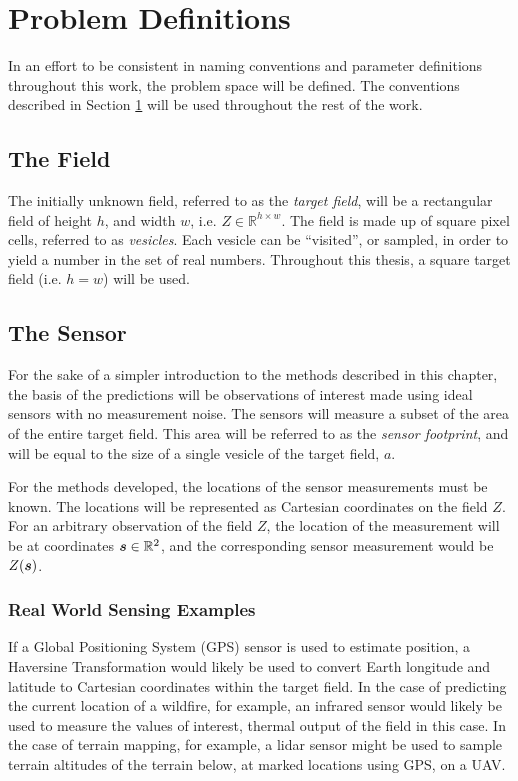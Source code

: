 \chapter{Problem Definitions} \label{ch:defs}
In an effort to be consistent in naming conventions and parameter definitions throughout this work, the problem space will be defined. The conventions described in Section \ref{ch:defs} will be used throughout the rest of the work.

\section{The Field}
The initially unknown field, referred to as the \textit{target field}, will be a rectangular field of height $h$, and width $w$, i.e. $Z \in \mathbb{R}^{h \times w}$. The field is made up of square pixel cells, referred to as \textit{vesicles}. Each vesicle can be ``visited'', or sampled, in order to yield a number in the set of real numbers. Throughout this thesis, a square target field (i.e. $h = w$) will be used.

\section{The Sensor} \label{sec:sensor_measurements}
For the sake of a simpler introduction to the methods described in this chapter, the basis of the predictions will be observations of interest made using ideal sensors with no measurement noise. The sensors will measure a subset of the area of the entire target field. This area will be referred to as the \textit{sensor footprint}, and will be equal to the size of a single vesicle of the target field, $a$.

For the methods developed, the locations of the sensor measurements must be known. The locations will be represented as Cartesian coordinates on the field $Z$. For an arbitrary observation of the field $Z$, the location of the measurement will be at coordinates ${\it{\boldsymbol{s}}} \in \mathbb{R}^2$, and the corresponding sensor measurement would be $Z({\it{\boldsymbol{s}}})$.

\subsection{Real World Sensing Examples}
If a Global Positioning System (GPS) sensor is used to estimate position, a Haversine Transformation would likely be used to convert Earth longitude and latitude to Cartesian coordinates within the target field. In the case of predicting the current location of a wildfire, for example, an infrared sensor would likely be used to measure the values of interest, thermal output of the field in this case. In the case of terrain mapping, for example, a lidar sensor might be used to sample terrain altitudes of the terrain below, at marked locations using GPS, on a UAV.

